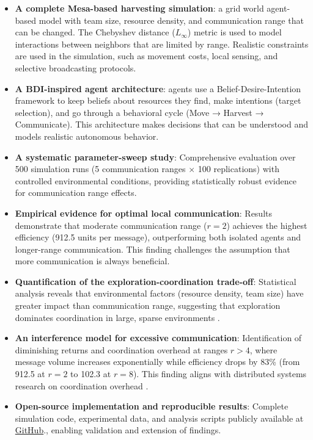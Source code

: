 \begin{itemize}
    \item \textbf{A complete Mesa-based harvesting simulation}: a grid world agent-based model \citep{bonabeau2002agent, gilbert2005simulation} with team size, resource density, and communication range that can be changed. The Chebyshev distance ($L_\infty$) metric \citep{deza2009encyclopedia} is used to model interactions between neighbors that are limited by range. Realistic constraints are used in the simulation, such as movement costs, local sensing, and selective broadcasting protocols.

    \item \textbf{A BDI-inspired agent architecture}: agents use a Belief-Desire-Intention framework \citep{rao1995bdi, georgeff1999belief} to keep beliefs about resources they find, make intentions (target selection), and go through a behavioral cycle (Move → Harvest → Communicate). This architecture makes decisions that can be understood and models realistic autonomous behavior.

    \item \textbf{A systematic parameter-sweep study}: Comprehensive evaluation over 500 simulation runs (5 communication ranges $\times$ 100 replications) with controlled environmental conditions, providing statistically robust evidence for communication range effects.

    \item \textbf{Empirical evidence for optimal local communication}: Results demonstrate that moderate communication range ($r=2$) achieves the highest efficiency (912.5 units per message), outperforming both isolated agents and longer-range communication. This finding challenges the assumption that more communication is always beneficial.

    \item \textbf{Quantification of the exploration-coordination trade-off}: Statistical analysis reveals that environmental factors (resource density, team size) have greater impact than communication range, suggesting that exploration dominates coordination in large, sparse environments \citep{march1991exploration}.

    \item \textbf{An interference model for excessive communication}: Identification of diminishing returns and coordination overhead at ranges $r > 4$, where message volume increases exponentially while efficiency drops by 83\% (from 912.5 at $r=2$ to 102.3 at $r=8$). This finding aligns with distributed systems research on coordination overhead \citep{lynch1996distributed}.

    \item \textbf{Open-source implementation and reproducible results}: Complete simulation code, experimental data, and analysis scripts publicly available at \href{https://github.com/marufdevops/multiagent-cooperation-research}{GitHub}., enabling validation and extension of findings.
\end{itemize}